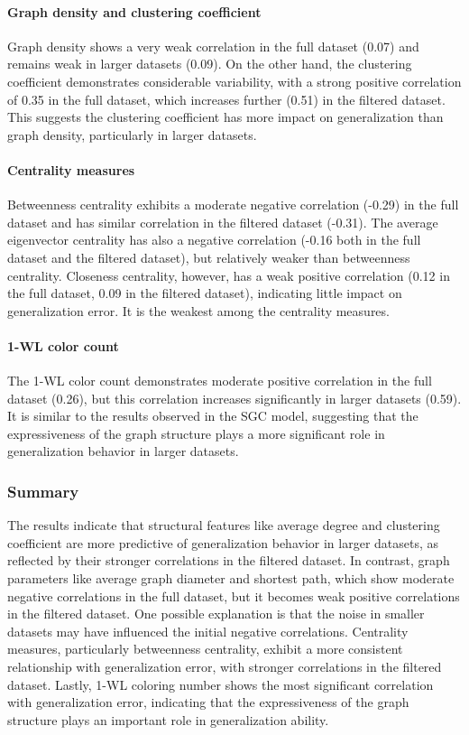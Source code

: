 \paragraph{Graph density and clustering coefficient}
Graph density shows a very weak correlation in the full dataset (0.07) and remains weak in larger datasets (0.09). On the other hand, the clustering coefficient demonstrates considerable variability, with a strong positive correlation of 0.35 in the full dataset, which increases further (0.51) in the filtered dataset. This suggests the clustering coefficient has more impact on generalization than graph density, particularly in larger datasets.

\paragraph{Centrality measures}
Betweenness centrality exhibits a moderate negative correlation (-0.29) in the full dataset and has similar correlation in the filtered dataset (-0.31). The average eigenvector centrality has also a negative correlation (-0.16 both in the full dataset and the filtered dataset), but relatively weaker than betweenness centrality. Closeness centrality, however, has a weak positive correlation (0.12 in the full dataset, 0.09 in the filtered dataset), indicating little impact on generalization error. It is the weakest among the centrality measures. 

\paragraph{1-WL color count}
The 1-WL color count demonstrates moderate positive correlation in the full dataset (0.26), but this correlation increases significantly in larger datasets (0.59). It is similar to the results observed in the SGC model, suggesting that the expressiveness of the graph structure plays a more significant role in generalization behavior in larger datasets.

\subsubsection{Summary}
The results indicate that structural features like average degree and clustering coefficient are more predictive of generalization behavior in larger datasets, as reflected by their stronger correlations in the filtered dataset. In contrast, graph parameters like average graph diameter and shortest path, which show moderate negative correlations in the full dataset, but it becomes weak positive correlations in the filtered dataset. One possible explanation is that the noise in smaller datasets may have influenced the initial negative correlations. Centrality measures, particularly betweenness centrality, exhibit a more consistent relationship with generalization error, with stronger correlations in the filtered dataset. Lastly, 1-WL coloring number shows the most significant correlation with generalization error, indicating that the expressiveness of the graph structure plays an important role in generalization ability.

